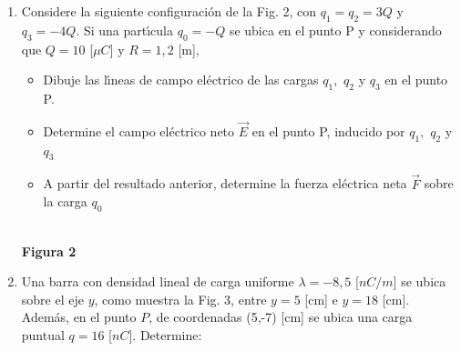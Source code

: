 \documentclass[12pt,onecolumn]{article}
\begin{document}
\begin{enumerate}
\item Considere la siguiente configuraci\'{o}n de la Fig. 2, con
$q_{1}=q_{2}=3Q$ y $q_{3}=-4Q$. Si una part\'{\i}cula $q_{0}=-Q$ se ubica en
el punto P y considerando que $Q=10$ [$\mu C$] y $R=1,2$ [m],

\begin{itemize}
\item Dibuje las l\'{\i}neas de campo el\'{e}ctrico de las cargas $q_{1},$
$q_{2}$ y $q_{3}$ en el punto P.

\item Determine el campo el\'{e}ctrico neto $\vec{E}$ en el punto P,
inducido por $q_{1},$ $q_{2}$ y $q_{3}$

\item A partir del resultado anterior, determine la fuerza el\'{e}ctrica
neta $\vec{F}$ sobre la carga $q_{0}$
\end{itemize}

\begin{center}
\\[-2pt]
{\small \textbf{Figura 2}}
\end{center}

\pagebreak

\item Una barra con densidad lineal de carga uniforme $\lambda =-8,5$ [$nC/m$]
se ubica sobre el eje $y$, como muestra la Fig. 3, entre $y=5$ [cm] e $y=18$
[cm]. Adem\'{a}s, en el punto $P$, de coordenadas (5,-7) [cm] se ubica una
carga puntual $q=16$ [$nC$]. Determine:


\end{enumerate}
\end{document}
